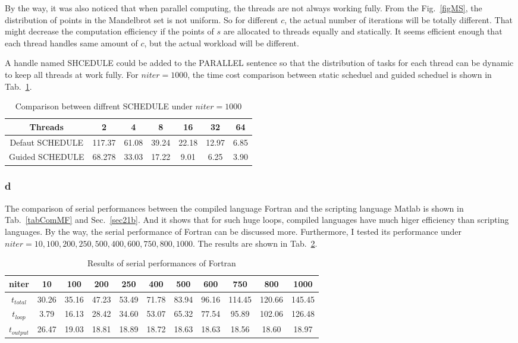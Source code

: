 \documentclass[letterpaper,10pt]{article}
\begin{document}
By the way, it was also noticed that when parallel computing, the threads are not always working fully. From the Fig.~\ref{figMS}, 
the distribution of points in the Mandelbrot set is not uniform. So for different $c$, the actual number of iterations 
will be totally different. That might decrease the computation efficiency if the points of $s$ are allocated to threads 
equally and statically. It seems efficient enough that each thread handles same amount of $c$, but the actual workload 
will be different. 

A handle named SHCEDULE could be added to the PARALLEL sentence so that the distribution of tasks for each thread can be dynamic 
to keep all threads at work fully. For $niter = 1000$, the time cost comparison between static scheduel and guided scheduel 
is shown in Tab.~\ref{tabComSche}. 
\begin{table}
\centering  
\caption{Comparison between diffrent SCHEDULE under $niter=1000$}\label{tabComSche}
\begin{tabular}{ccccccc}
  \hline
  Threads & 2 & 4 & 8 & 16 &32 &64\\
  \hline
  Defaut SCHEDULE & 117.37& 61.08& 39.24&22.18&12.97&6.85\\
  Guided SCHEDULE & 68.278& 33.03& 17.22&9.01&6.25&3.90\\
  \hline
\end{tabular}
\end{table}

\subsubsection{d}
The comparison of serial performances between the compiled language Fortran and the scripting language Matlab 
is shown in Tab.~\ref{tabComMF} and Sec.~\ref{sec21b}. And it shows that for such huge loops, 
compiled languages have much higer efficiency than scripting languages. 
By the way, the serial performance of Fortran can be discussed more. Furthermore, I tested its performance 
under $niter= 10,100,200,250,500,400,600,750,800,1000$. The results are shown in Tab.~\ref{tabFS}. 
\begin{table}
\centering  
\caption{Results of serial performances of Fortran}\label{tabFS}
\begin{tabular}{ccccccccccc}
  \hline
  niter & 10 & 100 & 200 & 250&400 & 500 & 600 & 750 & 800&1000\\
  \hline
  $t_{total}$ & 30.26&35.16&47.23&53.49&71.78&83.94&96.16&114.45&120.66&145.45\\
  $t_{loop}$ & 3.79&16.13&28.42&34.60&53.07&65.32&77.54&95.89&102.06&126.48\\
  $t_{output}$ & 26.47&19.03&18.81&18.89&18.72&18.63&18.63&18.56&18.60&18.97\\
  \hline
\end{tabular}
\end{table}
\end{document}
